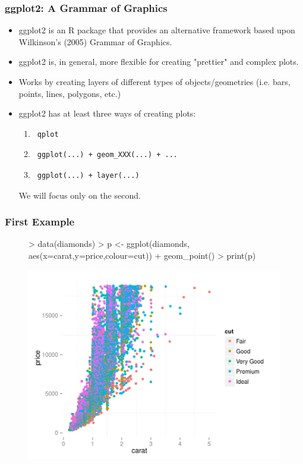 \documentclass[10pt,slidestop,mathserif,c]{beamer}
\begin{document}
\begin{frame}
	\frametitle{ggplot2: A Grammar of Graphics}
	\begin{itemize}
		\item ggplot2 is an R package that provides an alternative framework based upon Wilkinson's (2005) Grammar of Graphics.
		\item ggplot2 is, in general, more flexible for creating "prettier" and complex plots.
		\item Works by creating layers of different types of objects/geometries (i.e. bars, points, lines, polygons, etc.)
		\item ggplot2 has at least three ways of creating plots:
			\begin{enumerate}
				\item \begin{verbatim} qplot \end{verbatim} 
				\item \begin{verbatim} ggplot(...) + geom_XXX(...) + ... \end{verbatim}
				\item \begin{verbatim} ggplot(...) + layer(...) \end{verbatim}
			\end{enumerate}
		We will focus only on the second.
	\end{itemize}
\end{frame}

\begin{frame}
	\frametitle{First Example}
\begin{figure}
\begin{Schunk}
\begin{Sinput}
> data(diamonds)
> p <- ggplot(diamonds, aes(x=carat,y=price,colour=cut)) + 
   	geom_point()
> print(p)
\end{Sinput}
\end{Schunk}
\includegraphics{Slides-ggplot-fig1}
\end{figure}
\end{frame}
\end{document}
